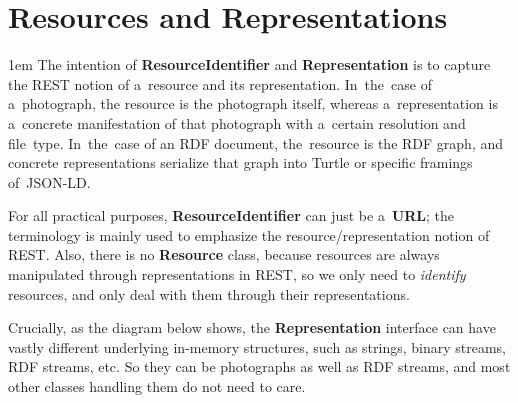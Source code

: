 \documentclass[10pt]{article}
\newenvironment{Note}
  {\begin{multicols}{3}%
     \parskip 1em}
  {\end{multicols}}
\begin{document}

\clearpage

\section*{Resources and Representations}
\begin{Note}
The intention of \textbf{ResourceIdentifier} and \textbf{Representation}
is to capture the REST notion of a~resource and its representation.
In~the~case of a~photograph,
the resource is the photograph itself,
whereas a~representation is a~concrete manifestation of that photograph
with a~certain resolution and file~type.
In~the~case of an RDF document,
the~resource is the RDF graph,
and concrete representations serialize that graph
into Turtle or specific framings of~JSON-LD.
\columnbreak

For all practical purposes,
\textbf{ResourceIdentifier} can just be a~\textbf{URL};
the terminology is mainly used to emphasize
the resource/representation notion of REST.
Also, there is no \textbf{Resource} class,
because resources are always manipulated through representations in REST,
so we only need to \emph{identify} resources,
and only deal with them through their representations.
\columnbreak

Crucially, as the diagram below shows,
the \textbf{Representation} interface
can have vastly different underlying in-memory structures,
such as strings, binary streams, RDF streams, etc.
So they can be photographs as well as RDF streams,
and most other classes handling them do not need to care.
\end{Note}
\end{document}
